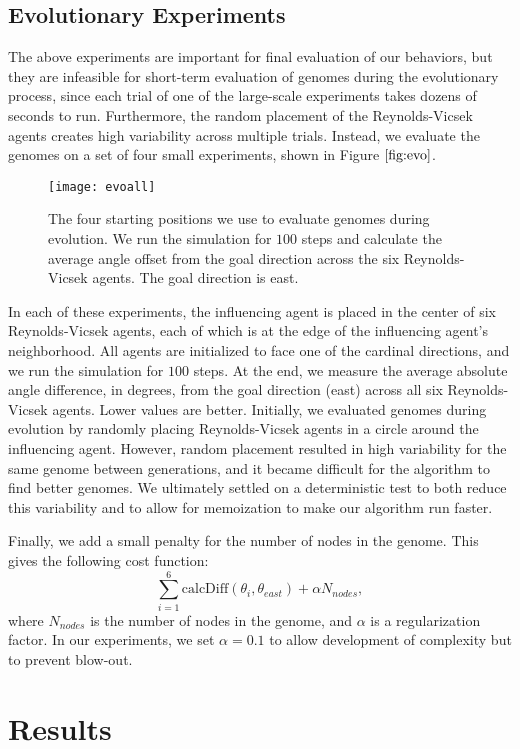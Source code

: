 \subsection{Evolutionary Experiments}
The above experiments are important for final evaluation of our behaviors, but
they are infeasible for short-term evaluation of genomes during
the evolutionary process, since each trial of one of the large-scale
experiments takes dozens of seconds to run.
Furthermore, the random placement of the Reynolds-Vicsek agents creates high
variability across multiple trials.
Instead, we evaluate the genomes on a set of four small experiments, shown in
Figure $\ref{fig:evo}$.
\begin{figure}
    \centering
    \texttt{[image: evoall]}
    \caption{The four starting positions we use to evaluate genomes during
    evolution.
    We run the simulation for $100$ steps and calculate the average angle offset
    from the goal direction across the six Reynolds-Vicsek agents.
    The goal direction is east.}
    \label{fig:evo}
\end{figure}
In each of these experiments, the influencing agent is placed in the center of
six Reynolds-Vicsek agents, each of which is at the edge of the influencing
agent's neighborhood.
All agents are initialized to face one of the cardinal directions, and we run
the simulation for $100$ steps.
At the end, we measure the average absolute angle difference, in degrees, from
the goal direction (east) across all six Reynolds-Vicsek agents.
Lower values are better.
Initially, we evaluated genomes during evolution by randomly placing
Reynolds-Vicsek agents in a circle around the influencing agent.
However, random placement resulted in high variability for the same genome
between generations, and it became difficult for the algorithm to find better
genomes.
We ultimately settled on a deterministic test to both reduce this variability
and to allow for memoization to make our algorithm run faster.

Finally, we add a small penalty for the number of nodes in the genome.
This gives the following cost function:
\[ \sum_{i=1}^6 \text{calcDiff}(\theta_i, \theta_{east}) + \alpha N_{nodes}, \]
where $N_{nodes}$ is the number of nodes in the genome, and $\alpha$ is a
regularization factor.
In our experiments, we set $\alpha=0.1$ to allow development of complexity but
to prevent blow-out.

\section{Results}
